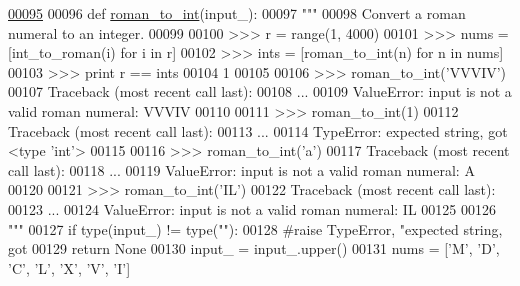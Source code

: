 \begin{DoxyCode}
\hypertarget{namespacepyneb_1_1utils_1_1misc_l00095}{}\hyperlink{namespacepyneb_1_1utils_1_1misc_ae67dbd6bb48d64216bc162ebdc25a183}{00095} 
00096 \textcolor{keyword}{def }\hyperlink{namespacepyneb_1_1utils_1_1misc_ae67dbd6bb48d64216bc162ebdc25a183}{roman\_to\_int}(input\_):
00097     \textcolor{stringliteral}{"""}
00098 \textcolor{stringliteral}{    Convert a roman numeral to an integer.}
00099 \textcolor{stringliteral}{    }
00100 \textcolor{stringliteral}{    >>> r = range(1, 4000)}
00101 \textcolor{stringliteral}{    >>> nums = [int\_to\_roman(i) for i in r]}
00102 \textcolor{stringliteral}{    >>> ints = [roman\_to\_int(n) for n in nums]}
00103 \textcolor{stringliteral}{    >>> print r == ints}
00104 \textcolor{stringliteral}{    1}
00105 \textcolor{stringliteral}{    }
00106 \textcolor{stringliteral}{    >>> roman\_to\_int('VVVIV')}
00107 \textcolor{stringliteral}{    Traceback (most recent call last):}
00108 \textcolor{stringliteral}{     ...}
00109 \textcolor{stringliteral}{    ValueError: input is not a valid roman numeral: VVVIV}
00110 \textcolor{stringliteral}{}
00111 \textcolor{stringliteral}{    >>> roman\_to\_int(1)}
00112 \textcolor{stringliteral}{    Traceback (most recent call last):}
00113 \textcolor{stringliteral}{     ...}
00114 \textcolor{stringliteral}{    TypeError: expected string, got <type 'int'>}
00115 \textcolor{stringliteral}{}
00116 \textcolor{stringliteral}{    >>> roman\_to\_int('a')}
00117 \textcolor{stringliteral}{    Traceback (most recent call last):}
00118 \textcolor{stringliteral}{     ...}
00119 \textcolor{stringliteral}{    ValueError: input is not a valid roman numeral: A}
00120 \textcolor{stringliteral}{}
00121 \textcolor{stringliteral}{    >>> roman\_to\_int('IL')}
00122 \textcolor{stringliteral}{    Traceback (most recent call last):}
00123 \textcolor{stringliteral}{     ...}
00124 \textcolor{stringliteral}{    ValueError: input is not a valid roman numeral: IL}
00125 \textcolor{stringliteral}{}
00126 \textcolor{stringliteral}{    """}   
00127     \textcolor{keywordflow}{if} type(input\_) != type(\textcolor{stringliteral}{""}):
00128         \textcolor{comment}{#raise TypeError, "expected string, got %
00129         \textcolor{keywordflow}{return} \textcolor{keywordtype}{None}
00130     input\_ = input\_.upper()
00131     nums = [\textcolor{stringliteral}{'M'}, \textcolor{stringliteral}{'D'}, \textcolor{stringliteral}{'C'}, \textcolor{stringliteral}{'L'}, \textcolor{stringliteral}{'X'}, \textcolor{stringliteral}{'V'}, \textcolor{stringliteral}{'I'}]
}
\end{DoxyCode}
